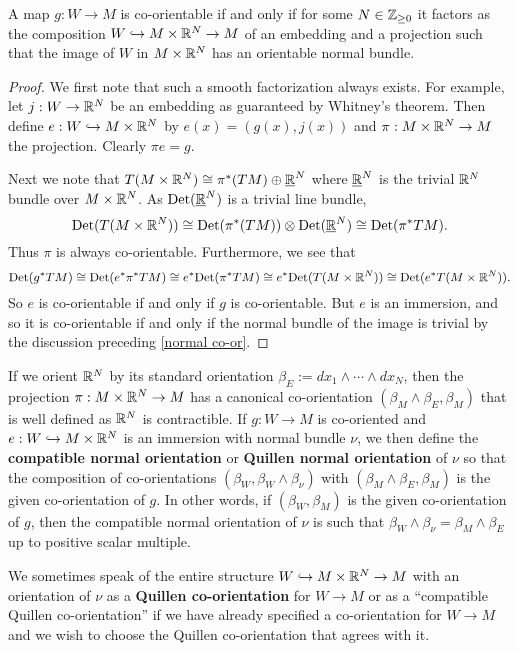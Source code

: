 \begin{lemma}\label{L: Quillen}
A map $g:W\to M$ is co-orientable if and only if for some $N\in \mathbb{Z}_{\geq 0}$ it factors as the composition $W\hookrightarrow M\times \mathbb{R}^N \to M$ of an embedding and a projection   such that the image of $W$ in $M\times \mathbb{R}^N$ has an orientable normal bundle.
\end{lemma}
\begin{proof}
We first note that such a smooth factorization always exists. For example, let $j:W\to \mathbb{R}^N$ be an embedding as guaranteed by Whitney's theorem. Then define $e:W\hookrightarrow M\times \mathbb{R}^N$ by $e(x)=(g(x),j(x))$ and  $\pi:M\times \mathbb{R}^N\to M$ the projection. Clearly $\pi e=g$.

Next we note that  $T(M\times \mathbb{R}^N)\cong \pi^*(TM)\oplus \underline{\mathbb{R}}^N$ where $\underline{\mathbb{R}}^N$ is the trivial $\mathbb{R}^N$ bundle over $M\times \mathbb{R}^N$. As $ {\rm Det}( \underline{\mathbb{R}}^N)$ is a trivial line bundle,  
 $${\rm Det}(T(M\times \mathbb{R}^N))\cong {\rm Det}( \pi^*(TM)) \otimes {\rm Det}(\underline{\mathbb{R}}^N)\cong {\rm Det}(\pi^*TM).$$ Thus  $\pi$ is always co-orientable. Furthermore, we see that 
$${\rm Det}(g^*TM)\cong {\rm Det}(e^*\pi^*TM)\cong e^*{\rm Det}(\pi^*TM)\cong e^*{\rm Det}(T(M\times \mathbb{R}^N))\cong {\rm Det}(e^*T(M\times \mathbb{R}^N)).$$ So $e$ is co-orientable if and only if $g$ is co-orientable. But 
 $e$ is an immersion, and so it is co-orientable if and only if the normal bundle of the image is trivial by the discussion preceding \cref{normal co-or}. 
\end{proof}







\begin{definition}\label{D: Quillen normal or}
If we orient  $\mathbb{R}^N$ by its standard orientation $\beta_E:= dx_1\wedge\cdots\wedge dx_N$, then the projection $\pi:M\times \mathbb{R}^N\to M$ has a canonical co-orientation $(\beta_M\wedge \beta_E,\beta_M)$ that is well defined as $\mathbb{R}^N$ is contractible. If $g:W\to M$ is co-oriented and $e:W\hookrightarrow M\times \mathbb{R}^N$ is an immersion with normal bundle $\nu$, we then define the \textbf{compatible normal orientation} or \textbf{Quillen normal orientation} of $\nu$ so that the composition of co-orientations $(\beta_W,\beta_W\wedge \beta_\nu)$ with $(\beta_M\wedge \beta_E,\beta_M)$ is the given co-orientation of $g$. In other words, if $(\beta_W,\beta_M)$ is the given co-orientation of $g$, then the compatible normal orientation of $\nu$ is such that $\beta_W\wedge \beta_\nu=
\beta_M\wedge \beta_E$ up to positive scalar multiple.

We sometimes speak of the entire structure $W\hookrightarrow M\times \mathbb{R}^N\to M$ with an orientation of $\nu$ as a \textbf{Quillen co-orientation} for $W\to M$ or as a ``compatible Quillen co-orientation'' if we have already specified a co-orientation for $W\to M$ and we wish to choose the Quillen co-orientation that agrees with it.
\end{definition}

